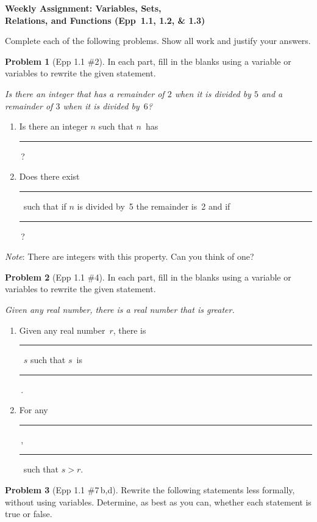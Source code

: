 \documentclass[11pt]{article}
\begin{document}
\begin{center}
  {\Large\bfseries Weekly Assignment: Variables, Sets,\\[2pt]
   Relations, and Functions (Epp~1.1, 1.2, \& 1.3)}
\end{center}

\bigskip

\noindent
Complete each of the following problems.  Show all work and justify your answers.

\bigskip

\noindent\textbf{Problem 1} (Epp 1.1 \#2). \;
In each part, fill in the blanks using a variable or variables to
rewrite the given statement.

\medskip\noindent
\emph{Is there an integer that has a remainder of\/ $2$ when it is
divided by\/ $5$ and a remainder of\/ $3$ when it is divided
by\/~$6$?}

\begin{enumerate}[label=\textbf{\alph*.},itemsep=4pt]
  \item Is there an integer $n$ such that $n$~has \rule{2.5cm}{0.4pt}\,?
  \item Does there exist \rule{2.5cm}{0.4pt}\ such that if $n$ is
        divided by~5 the remainder is~2 and if
        \rule{2.5cm}{0.4pt}\,?
\end{enumerate}

\noindent
\emph{Note}: There are integers with this property.
Can you think of one?

\bigskip

\noindent\textbf{Problem 2} (Epp 1.1 \#4). \;
In each part, fill in the blanks using a variable or variables to
rewrite the given statement.

\medskip\noindent
\emph{Given any real number, there is a real number that is
greater.}

\begin{enumerate}[label=\textbf{\alph*.},itemsep=4pt]
  \item Given any real number~$r$, there is \rule{2.5cm}{0.4pt}\ $s$
        such that $s$~is \rule{2.5cm}{0.4pt}\,.
  \item For any \rule{2.5cm}{0.4pt}\,, \rule{2.5cm}{0.4pt}\ such
        that $s > r$.
\end{enumerate}

\bigskip

\noindent\textbf{Problem 3} (Epp 1.1 \#7\,b,d). \;
Rewrite the following statements less formally, without using
variables.  Determine, as best as you can, whether each
statement is true or false.
\end{document}
